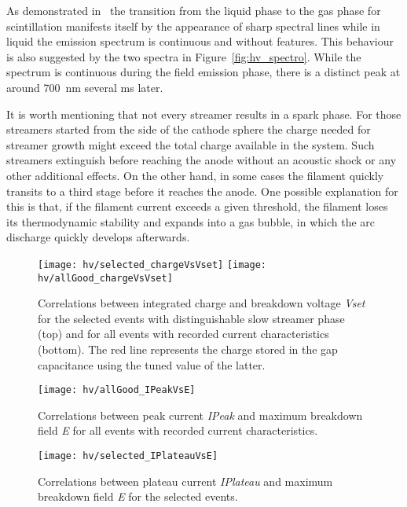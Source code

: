 As demonstrated in~\cite{Heindl} the transition from the liquid phase to the gas phase for scintillation manifests itself by the appearance of sharp spectral lines while in liquid the emission spectrum is continuous and without features.
This behaviour is also suggested by the two spectra in Figure~\ref{fig:hv_spectro}.
While the spectrum is continuous during the field emission phase, there is a distinct peak at around \SI{700}{\nano\metre} several \si{\milli\second} later.

It is worth mentioning that not every streamer results in a spark phase.
For those streamers started from the side of the cathode sphere the charge needed for streamer growth might exceed the total charge available in the system.
Such streamers extinguish before reaching the anode without an acoustic shock or any other additional effects.
On the other hand, in some cases the filament quickly transits to a third stage before it reaches the anode.
One possible explanation for this is that, if the filament current exceeds a given threshold, the filament loses its thermodynamic stability and expands into a gas bubble, in which the arc discharge quickly develops afterwards.

\begin{figure}[p]
	\centering
	\texttt{[image: hv/selected\_chargeVsVset]}
	\texttt{[image: hv/allGood\_chargeVsVset]}
	\caption[ test integrated charge versus breakdown voltage]{%
		Correlations between integrated charge and breakdown voltage \emph{Vset} for the selected events with distinguishable slow streamer phase (top) and for all events with recorded current characteristics (bottom).
		The red line represents the charge stored in the gap capacitance using the tuned value of the latter.
	}
	\label{fig:hv_chargeVsVset}
\end{figure}

\begin{figure}[p]
	\centering
	\texttt{[image: hv/allGood\_IPeakVsE]}
	\caption[ test peak current versus maximum breakdown field]{%
		Correlations between peak current \emph{IPeak} and maximum breakdown field \emph{E} for all events with recorded current characteristics.
	}
	\label{fig:hv_IPeakVsE}
\end{figure}

\begin{figure}[p]
	\centering
	\texttt{[image: hv/selected\_IPlateauVsE]}
	\caption[ test plateau current versus maximum breakdown field]{%
		Correlations between plateau current \emph{IPlateau} and maximum breakdown field \emph{E} for the selected events.
	}
	\label{fig:hv_IPlateauVsE}
\end{figure}

